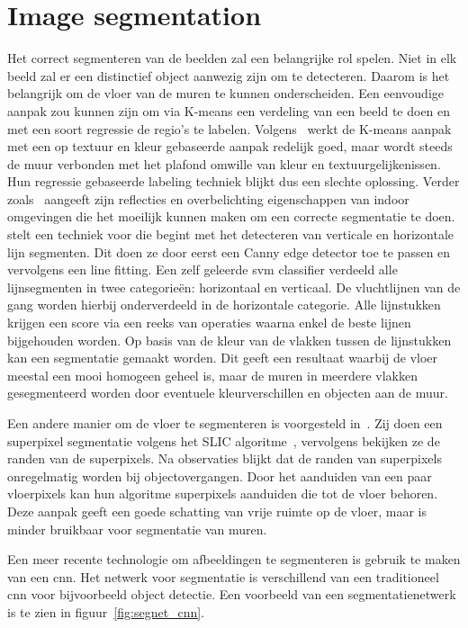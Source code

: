     \section{Image segmentation}\label{sec:image_segmentation}
        Het correct segmenteren van de beelden zal een belangrijke rol spelen. Niet in elk beeld zal er een distinctief object aanwezig zijn om te detecteren. Daarom is het belangrijk om de vloer van
        de muren te kunnen onderscheiden. Een eenvoudige aanpak zou kunnen zijn om via K-means een verdeling van een beeld te doen en met een soort regressie de regio's te labelen. 
        Volgens~\cite{zhangwall} werkt de K-means aanpak met een op textuur en kleur gebaseerde aanpak redelijk goed, maar wordt steeds de muur verbonden met het plafond omwille van kleur en textuurgelijkenissen.
        Hun regressie gebaseerde labeling techniek blijkt dus een slechte oplossing. Verder zoals~\cite{Li2010} aangeeft zijn reflecties en overbelichting eigenschappen van indoor omgevingen die het moeilijk kunnen maken om
        een correcte segmentatie te doen.
        \cite{Li2010} stelt een techniek voor die begint met het detecteren van verticale en horizontale lijn segmenten. Dit doen ze door eerst een Canny edge detector\cite{Canny} toe te passen en vervolgens een line fitting.
        Een zelf geleerde \gls{svm} classifier verdeeld alle lijnsegmenten in twee categorie\"{e}n: horizontaal en verticaal. De vluchtlijnen van de gang worden hierbij onderverdeeld in de horizontale categorie.
        Alle lijnstukken krijgen een score via een reeks van operaties waarna enkel de beste lijnen bijgehouden worden. Op basis van de kleur van de vlakken tussen de lijnstukken kan een segmentatie gemaakt worden.
        Dit geeft een resultaat waarbij de vloer meestal een mooi homogeen geheel is, maar de muren in meerdere vlakken gesegmenteerd worden door eventuele kleurverschillen en objecten aan de muur.
        
        Een andere manier om de vloer te segmenteren is voorgesteld in~\cite{Rodriguez-Telles2013}. Zij doen een superpixel segmentatie volgens het SLIC algoritme~\cite{slic}, vervolgens bekijken ze de randen van de superpixels.
        Na observaties blijkt dat de randen van superpixels onregelmatig worden bij objectovergangen. Door het aanduiden van een paar vloerpixels kan hun algoritme superpixels aanduiden die tot de vloer behoren.
        Deze aanpak geeft een goede schatting van vrije ruimte op de vloer, maar is minder bruikbaar voor segmentatie van muren.

        Een meer recente technologie om afbeeldingen te segmenteren is gebruik te maken van een \gls{cnn}. Het netwerk voor segmentatie is verschillend van een traditioneel \gls{cnn} voor bijvoorbeeld object detectie.
        Een voorbeeld van een segmentatienetwerk is te zien in figuur~\ref{fig:segnet_cnn}.

